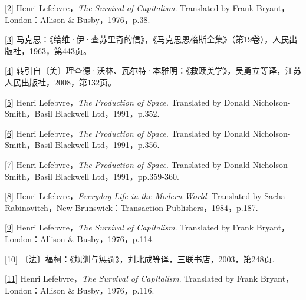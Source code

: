 \documentclass[UTF8, fontset = sourcesans, a4paper, oneside, zihao =
-4, scheme=chinese, no-math, space=true]{ctexbook}
\begin{document}
\protect\hypertarget{part0008_split_003.htmlux5cux23m2}{}{}\protect\hyperlink{part0008_split_000.htmlux5cux23w2}{{[}2{]}}
Henri Lefebvre，\emph{The Survival of Capitalism}. Translated by Frank
Bryant，London：Allison \& Busby，1976，p.38.

\protect\hypertarget{part0008_split_003.htmlux5cux23m3}{}{}\protect\hyperlink{part0008_split_000.htmlux5cux23w3}{{[}3{]}}
马克思：《给维·伊·查苏里奇的信》，《马克思恩格斯全集》（第19卷），人民出版社，1963，第443页。

\protect\hypertarget{part0008_split_003.htmlux5cux23m4}{}{}\protect\hyperlink{part0008_split_000.htmlux5cux23w4}{{[}4{]}}
转引自〔美〕理查德·沃林、瓦尔特·本雅明：《救赎美学》，吴勇立等译，江苏人民出版社，2008，第132页。

\protect\hypertarget{part0008_split_003.htmlux5cux23m5}{}{}\protect\hyperlink{part0008_split_001.htmlux5cux23w5}{{[}5{]}}
Henri Lefebvre，\emph{The Production of Space}. Translated by Donald
Nicholson-Smith，Basil Blackwell Ltd，1991，p.352.

\protect\hypertarget{part0008_split_003.htmlux5cux23m6}{}{}\protect\hyperlink{part0008_split_001.htmlux5cux23w6}{{[}6{]}}
Henri Lefebvre，\emph{The Production of Space}. Translated by Donald
Nicholson-Smith，Basil Blackwell Ltd，1991，p.356.

\protect\hypertarget{part0008_split_003.htmlux5cux23m7}{}{}\protect\hyperlink{part0008_split_001.htmlux5cux23w7}{{[}7{]}}
Henri Lefebvre，\emph{The Production of Space}. Translated by Donald
Nicholson-Smith，Basil Blackwell Ltd，1991，pp.359-360.

\protect\hypertarget{part0008_split_003.htmlux5cux23m8}{}{}\protect\hyperlink{part0008_split_001.htmlux5cux23w8}{{[}8{]}}
Henri Lefebvre，\emph{Everyday Life in the Modern World}. Translated by
Sacha Rabinovitch，New Brunswick：Transaction Publishers，1984，p.187.

\protect\hypertarget{part0008_split_003.htmlux5cux23m9}{}{}\protect\hyperlink{part0008_split_001.htmlux5cux23w9}{{[}9{]}}
Henri Lefebvre，\emph{The Survival of Capitalism}. Translated by Frank
Bryant，London：Allison \& Busby，1976，p.114.

\protect\hypertarget{part0008_split_003.htmlux5cux23m10}{}{}\protect\hyperlink{part0008_split_001.htmlux5cux23w10}{{[}10{]}}
〔法〕福柯：《规训与惩罚》，刘北成等译，三联书店，2003，第248页.

\protect\hypertarget{part0008_split_003.htmlux5cux23m11}{}{}\protect\hyperlink{part0008_split_001.htmlux5cux23w11}{{[}11{]}}
Henri Lefebvre，\emph{The Survival of Capitalism}. Translated by Frank
Bryant，London：Allison \& Busby，1976，p.116.
\end{document}
